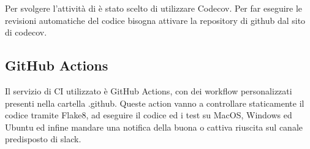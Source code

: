 Per svolgere l'attività di  è stato scelto di utilizzare Codecov. Per far eseguire le revisioni automatiche del codice bisogna attivare la repository di github dal sito di codecov.

\subsection{GitHub Actions}
Il servizio di CI utilizzato è GitHub Actions, con dei workflow personalizzati presenti nella cartella .github. Queste action vanno a controllare staticamente il codice tramite Flake8, ad eseguire il codice ed i test su MacOS, Windows ed Ubuntu ed infine mandare una notifica della buona o cattiva riuscita sul canale predisposto di slack.
